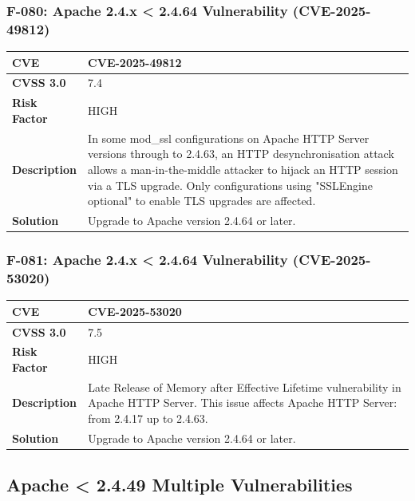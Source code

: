 \subsubsection{F-080: Apache 2.4.x < 2.4.64 Vulnerability (CVE-2025-49812)}
\begin{tabular}{|p{2.8cm}|p{12.2cm}|}
\hline
\textbf{CVE} & CVE-2025-49812 \\ \hline
\textbf{CVSS 3.0} & 7.4 \\ \hline
\textbf{Risk Factor} & HIGH \\ \hline
\textbf{Description} & In some mod\_ssl configurations on Apache HTTP Server versions through to 2.4.63, an HTTP desynchronisation attack allows a man-in-the-middle attacker to hijack an HTTP session via a TLS upgrade. Only configurations using "SSLEngine optional" to enable TLS upgrades are affected. \\ \hline
\textbf{Solution} & Upgrade to Apache version 2.4.64 or later. \\ \hline
\end{tabular}

\subsubsection{F-081: Apache 2.4.x < 2.4.64 Vulnerability (CVE-2025-53020)}
\begin{tabular}{|p{2.8cm}|p{12.2cm}|}
\hline
\textbf{CVE} & CVE-2025-53020 \\ \hline
\textbf{CVSS 3.0} & 7.5 \\ \hline
\textbf{Risk Factor} & HIGH \\ \hline
\textbf{Description} & Late Release of Memory after Effective Lifetime vulnerability in Apache HTTP Server. This issue affects Apache HTTP Server: from 2.4.17 up to 2.4.63. \\ \hline
\textbf{Solution} & Upgrade to Apache version 2.4.64 or later. \\ \hline
\end{tabular}

%
%
\subsection{Apache < 2.4.49 Multiple Vulnerabilities}

